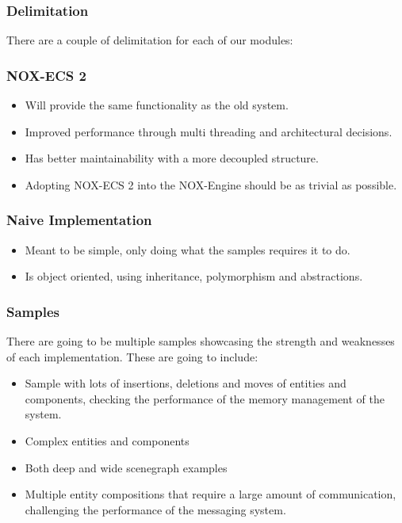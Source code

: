 \subsubsection{Delimitation}
There are a couple of delimitation for each of our modules:

\subsubsection*{NOX-ECS 2}
\begin{itemize}
    
    \item Will provide the same functionality as the old system.
    \item Improved performance through multi threading and architectural decisions.
    \item Has better maintainability with a more decoupled structure.
    \item Adopting NOX-ECS 2 into the NOX-Engine should be as trivial as possible.
    
\end{itemize}

\subsubsection*{Naive Implementation}
\begin{itemize}
    
    \item Meant to be simple, only doing what the samples requires it to do.
    \item Is object oriented, using inheritance, polymorphism and abstractions.

\end{itemize}

\subsubsection*{Samples}
There are going to be multiple samples showcasing the strength and weaknesses of each implementation. These are going to include:
\begin{itemize}
    
    \item Sample with lots of insertions, deletions and moves of entities and components, checking the performance of the memory management of the system.
    \item Complex entities and components
    \item Both deep and wide scenegraph examples
    \item Multiple entity compositions that require a large amount of communication, challenging the performance of the messaging system.
    
\end{itemize}